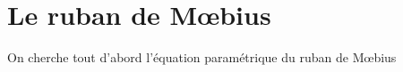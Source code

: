 \documentclass[a4paper,11pt]{book}
\begin{document}
\section{Le ruban de M{\oe}bius}
On cherche tout d'abord l'\'equation param\'etrique du ruban de M{\oe}bius\\
\end{document}
